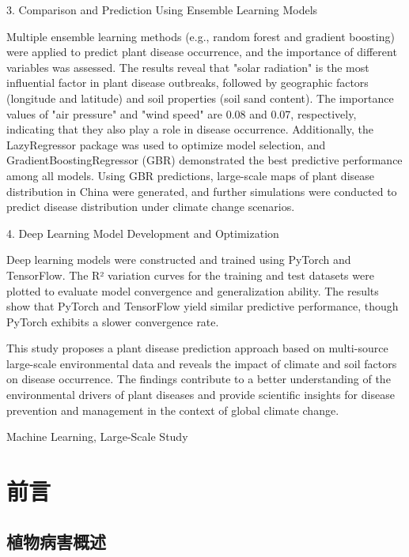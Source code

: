 \documentclass[AutoFakeBold]{LZUThesis-PgD&PhD}
\begin{document}
{		\par 3. Comparison and Prediction Using Ensemble Learning Models
		\par Multiple ensemble learning methods (e.g., random forest and gradient boosting) were applied to predict plant disease occurrence, and the importance of different variables was assessed. The results reveal that "solar radiation" is the most influential factor in plant disease outbreaks, followed by geographic factors (longitude and latitude) and soil properties (soil sand content). The importance values of "air pressure" and "wind speed" are 0.08 and 0.07, respectively, indicating that they also play a role in disease occurrence. Additionally, the LazyRegressor package was used to optimize model selection, and GradientBoostingRegressor (GBR) demonstrated the best predictive performance among all models. Using GBR predictions, large-scale maps of plant disease distribution in China were generated, and further simulations were conducted to predict disease distribution under climate change scenarios.
		
		\par 4. Deep Learning Model Development and Optimization
		\par Deep learning models were constructed and trained using PyTorch and TensorFlow. The R² variation curves for the training and test datasets were plotted to evaluate model convergence and generalization ability. The results show that PyTorch and TensorFlow yield similar predictive performance, though PyTorch exhibits a slower convergence rate.
		
		\par This study proposes a plant disease prediction approach based on multi-source large-scale environmental data and reveals the impact of climate and soil factors on disease occurrence. The findings contribute to a better understanding of the environmental drivers of plant diseases and provide scientific insights for disease prevention and management in the context of global climate change.
		}{Machine Learning, Large-Scale Study}
	
	\tableofcontents
	\mainmatter
	
	
	
	\chapter{前言}
	
	\section{植物病害概述}
	
\end{document}
